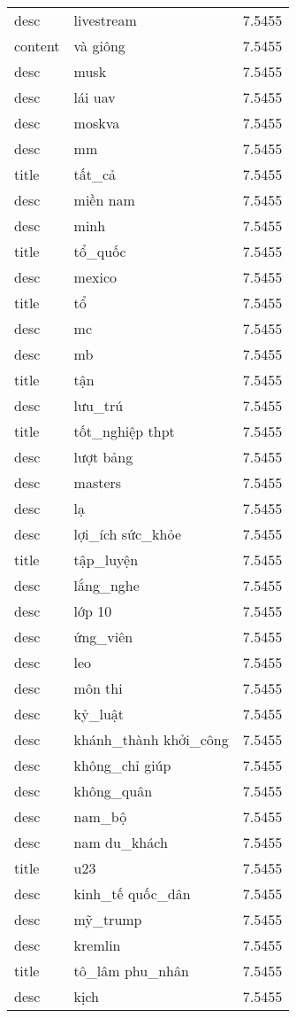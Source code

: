 \documentclass{article}
\begin{document}
\begin{tabular}{lll}
desc & livestream & 7.5455\\
content & và giông & 7.5455\\
desc & musk & 7.5455\\
desc & lái uav & 7.5455\\
desc & moskva & 7.5455\\
desc & mm & 7.5455\\
title & tất\_cả & 7.5455\\
desc & miền nam & 7.5455\\
desc & minh & 7.5455\\
title & tổ\_quốc & 7.5455\\
desc & mexico & 7.5455\\
title & tổ & 7.5455\\
desc & mc & 7.5455\\
desc & mb & 7.5455\\
title & tận & 7.5455\\
desc & lưu\_trú & 7.5455\\
title & tốt\_nghiệp thpt & 7.5455\\
desc & lượt bảng & 7.5455\\
desc & masters & 7.5455\\
desc & lạ & 7.5455\\
desc & lợi\_ích sức\_khỏe & 7.5455\\
title & tập\_luyện & 7.5455\\
desc & lắng\_nghe & 7.5455\\
desc & lớp 10 & 7.5455\\
desc & ứng\_viên & 7.5455\\
desc & leo & 7.5455\\
desc & môn thi & 7.5455\\
desc & kỷ\_luật & 7.5455\\
desc & khánh\_thành khởi\_công & 7.5455\\
desc & không\_chỉ giúp & 7.5455\\
desc & không\_quân & 7.5455\\
desc & nam\_bộ & 7.5455\\
desc & nam du\_khách & 7.5455\\
title & u23 & 7.5455\\
desc & kinh\_tế quốc\_dân & 7.5455\\
desc & mỹ\_trump & 7.5455\\
desc & kremlin & 7.5455\\
title & tô\_lâm phu\_nhân & 7.5455\\
desc & kịch & 7.5455\\

\end{tabular}
\end{document}
